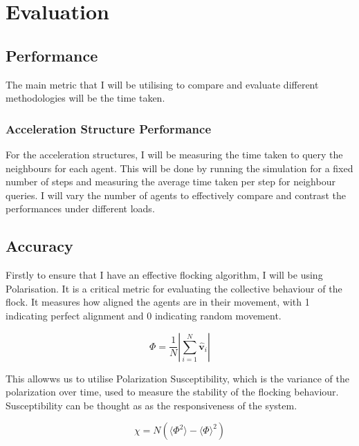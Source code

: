 \section{Evaluation}
\label{sec:evaluation}

\subsection{Performance}

The main metric that I will be utilising to compare and evaluate different methodologies will be the time taken.

\subsubsection{Acceleration Structure Performance}

For the acceleration structures, I will be measuring the time taken to query the neighbours for each agent. This will be done by running the simulation for a fixed number of steps and measuring the average time taken per step for neighbour queries.
I will vary the number of agents to effectively compare and contrast the performances under different loads.

\subsection{Accuracy}

Firstly to ensure that I have an effective flocking algorithm, I will be using Polarisation. It is a critical metric for evaluating the collective behaviour of the flock. It measures how aligned the agents are in their movement, with 1 indicating perfect alignment and 0 indicating random movement.

$$\Phi = \frac{1}{N} \left| \sum_{i=1}^{N} \hat{\mathbf{v}}_i \right|$$

This allowws us to utilise Polarization Susceptibility, which is the variance of the polarization over time, used to measure the stability of the flocking behaviour. Susceptibility can be thought as as the responsiveness of the system.

$$\chi = N (\langle \Phi^2 \rangle - \langle \Phi \rangle^2)$$